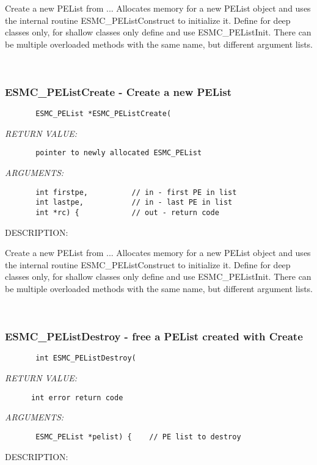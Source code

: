         Create a new PEList from ... Allocates memory for a new PEList
        object and uses the internal routine ESMC\_PEListConstruct to
        initialize it.  Define for deep classes only, for shallow classes only
        define and use ESMC\_PEListInit.
        There can be multiple overloaded methods with the same name, but
        different argument lists.
   
 
\mbox{}\hrulefill\ 
 
\subsubsection{ESMC\_PEListCreate - Create a new PEList}


  
\begin{verbatim}       ESMC_PEList *ESMC_PEListCreate(\end{verbatim}{\em RETURN VALUE:}
\begin{verbatim}       pointer to newly allocated ESMC_PEList\end{verbatim}{\em ARGUMENTS:}
\begin{verbatim}       int firstpe,          // in - first PE in list
       int lastpe,           // in - last PE in list
       int *rc) {            // out - return code\end{verbatim}
{\sf DESCRIPTION:\\ }


        Create a new PEList from ... Allocates memory for a new PEList
        object and uses the internal routine ESMC\_PEListConstruct to
        initialize it.  Define for deep classes only, for shallow classes only
        define and use ESMC\_PEListInit.
        There can be multiple overloaded methods with the same name, but
        different argument lists.
   
 
\mbox{}\hrulefill\ 
 
\subsubsection{ESMC\_PEListDestroy - free a PEList created with Create}


  
\begin{verbatim}       int ESMC_PEListDestroy(\end{verbatim}{\em RETURN VALUE:}
\begin{verbatim}      int error return code\end{verbatim}{\em ARGUMENTS:}
\begin{verbatim}       ESMC_PEList *pelist) {    // PE list to destroy\end{verbatim}
{\sf DESCRIPTION:\\ }


